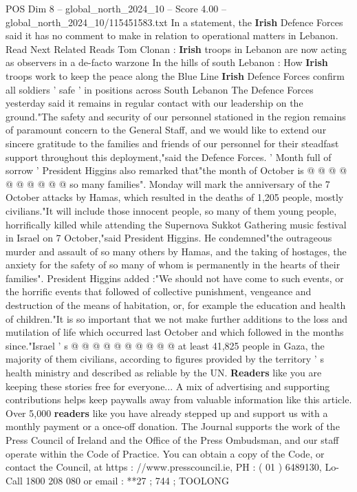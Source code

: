 \begin{textsample}{POS Dim 8 – global\_north\_2024\_10 – Score 4.00 – global\_north\_2024\_10/115451583.txt}
In a statement, the \textbf{Irish} Defence Forces said it has no comment to make in relation to operational matters in Lebanon.
Read Next Related Reads Tom Clonan : \textbf{Irish} troops in Lebanon are now acting as observers in a de-facto warzone In the hills of south Lebanon : How \textbf{Irish} troops work to keep the peace along the Blue Line \textbf{Irish} Defence Forces confirm all soldiers ' safe ' in positions across South Lebanon The Defence Forces yesterday said it remains in regular contact with our leadership on the ground."The safety and security of our personnel stationed in the region remains of paramount concern to the General Staff, and we would like to extend our sincere gratitude to the families and friends of our personnel for their steadfast support throughout this deployment,"said the Defence Forces. ' Month full of sorrow ' President Higgins also remarked that"the month of October is @ @ @ @ @ @ @ @ @ @ so many families".
Monday will mark the anniversary of the 7 October attacks by Hamas, which resulted in the deaths of 1,205 people, mostly civilians."It will include those innocent people, so many of them young people, horrifically killed while attending the Supernova Sukkot Gathering music festival in Israel on 7 October,"said President Higgins.
He condemned"the outrageous murder and assault of so many others by Hamas, and the taking of hostages, the anxiety for the safety of so many of whom is permanently in the hearts of their families".
President Higgins added :"We should not have come to such events, or the horrific events that followed of collective punishment, vengeance and destruction of the means of habitation, or, for example the education and health of children."It is so important that we not make further additions to the loss and mutilation of life which occurred last October and which followed in the months since."Israel ' s @ @ @ @ @ @ @ @ @ @ at least 41,825 people in Gaza, the majority of them civilians, according to figures provided by the territory ' s health ministry and described as reliable by the UN. \textbf{Readers} like you are keeping these stories free for everyone...
A mix of advertising and supporting contributions helps keep paywalls away from valuable information like this article.
Over 5,000 \textbf{readers} like you have already stepped up and support us with a monthly payment or a once-off donation.
The Journal supports the work of the Press Council of Ireland and the Office of the Press Ombudsman, and our staff operate within the Code of Practice.
You can obtain a copy of the Code, or contact the Council, at https : //www.presscouncil.ie, PH : ( 01 ) 6489130, Lo-Call 1800 208 080 or email : **27 ; 744 ; TOOLONG

\end{textsample}
